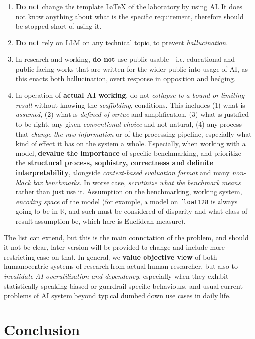 \documentclass[10pt,a4paper]{article}
\begin{document}
\begin{enumerate}
    \item \textbf{Do not} change the template LaTeX of the laboratory by using AI. It does not know anything about what is the specific requirement, therefore should be stopped short of using it. 
    \item \textbf{Do not} rely on LLM on any technical topic, to prevent \textit{hallucination}. 
    \item In research and working, \textbf{do not} use public-usable - i.e. educational and public-facing works that are written for the wider public into usage of AI, as this enacts both hallucination, overt response in opposition and hedging. 
    \item In operation of \textbf{actual AI working}, do not \textit{collapse to a bound or limiting result} without knowing the \textit{scaffolding}, conditions. This includes (1) what is \textit{assumed}, (2) what is \textit{defined of virtue} and simplification, (3) what is justified to be right, any given \textit{conventional choice} and not natural, (4) any process that \textit{change the raw information} or of the processing pipeline, especially what kind of effect it has on the system a whole. Especially, when working with a model, \textbf{devalue the importance} of specific benchmarking, and prioritize the \textbf{structural process, sophistry, correctness and definite interpretability}, alongside \textit{context-based evaluation format} and many \textit{non-black box benchmarks}. In worse case, \textit{scrutinize what the benchmark means} rather than just use it. Assumption on the benchmarking, working system, \textit{encoding space} of the model (for example, a model on \texttt{float128} is always going to be in $\mathbb{R}$, and such must be considered of disparity and what class of result assumption be, which here is Euclidean measure). 
\end{enumerate}

The list can extend, but this is the main connotation of the problem, and should it not be clear, later version will be provided to change and include more restricting case on that. In general, we \textbf{value objective view} of both humanocentric systems of research from actual human researcher, but also to \textit{invalidate AI-overutilization and dependency}, especially when they exhibit statistically speaking biased or guardrail specific behaviours, and usual current problems of AI system beyond typical dumbed down use cases in daily life. 

\section{Conclusion}
\end{document}
